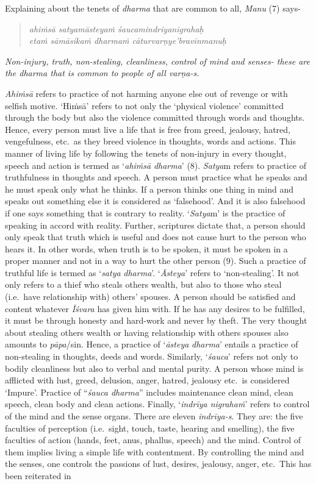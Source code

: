 Explaining about the tenets of \emph{dharma} that are common to all, \emph{Manu} (7) says-

\begin{verse}
\emph{ahiṁsā satyamāsteyaṁ śaucamindriyanigrahaḥ }\\
\emph{etaṁ sāmāsikaṁ dharmaṁ cāturvarṇye'bravīnmanuḥ~}
\end{verse}

\emph{Non-injury, truth, non-stealing, cleanliness, control of mind and senses- these are the dharma that is common to people of all varṇa-s.}

\emph{Ahiṁsā} refers to practice of not harming anyone else out of revenge or with selfish motive. `Hiṁsā' refers to not only the `physical violence' committed through the body but also the violence committed through words and thoughts. Hence, every person must live a life that is free from greed, jealousy, hatred, vengefulness, etc.\ as they breed violence in thoughts, words and actions. This manner of living life by following the tenets of non-injury in every thought, speech and action is termed as `\emph{ahiṁsā} \emph{dharma}' (8). \emph{Satya}m refers to practice of truthfulness in thoughts and speech. A person must practice what he speaks and he must speak only what he thinks. If a person thinks one thing in mind and speaks out something else it is considered as `falsehood'. And it is also falsehood if one says something that is contrary to reality. `\emph{Satya}m' is the practice of speaking in accord with reality. Further, scriptures dictate that, a person should only speak that truth which is useful and does not cause hurt to the person who hears it. In other words, when truth is to be spoken, it must be spoken in a proper manner and not in a way to hurt the other person (9). Such a practice of truthful life is termed as `\emph{satya} \emph{dharma}'. `\emph{Āsteya}' refers to `non-stealing'. It not only refers to a thief who steals others wealth, but also to those who steal (i.e.\ have relationship with) others' spouses. A person should be satisfied and content whatever \emph{Īśvara} has given him with. If he has any desires to be fulfilled, it must be through honesty and hard-work and never by theft. The very thought about stealing others wealth or having relationship with others spouses also amounts to \emph{pāpa}/sin. Hence, a practice of `\emph{āsteya} \emph{dharma}' entails a practice of non-stealing in thoughts, deeds and words. Similarly, `\emph{śauca}' refers not only to bodily cleanliness but also to verbal and mental purity. A person whose mind is afflicted with lust, greed, delusion, anger, hatred, jealousy etc.\ is considered `Impure'. Practice of ``\emph{śauca dharma}'' includes maintenance clean mind, clean speech, clean body and clean actions. Finally, `\emph{indrīya nigrahaṁ}' refers to control of the mind and the sense organs. There are eleven \emph{indrīya-s}. They are: the five faculties of perception (i.e.\ sight, touch, taste, hearing and smelling), the five faculties of action (hands, feet, anus, phallus, speech) and the mind. Control of them implies living a simple life with contentment. By controlling the mind and the senses, one controls the passions of lust, desires, jealousy, anger, etc.\ This has been reiterated in 